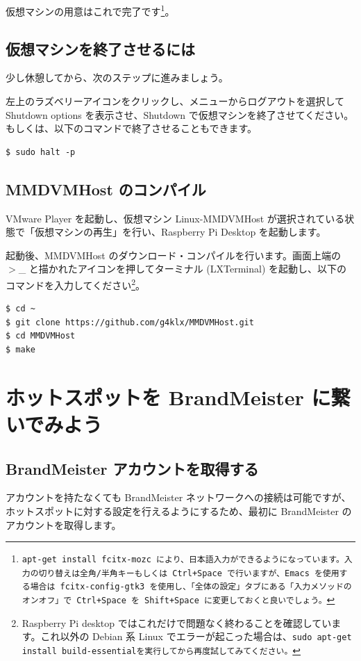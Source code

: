 \documentclass[a4j,oneside]{ujbook}
\begin{document}
仮想マシンの用意はこれで完了です\footnote{\tt{apt-get install fcitx-mozc} により、日本語入力ができるようになっています。入力の切り替えは全角/半角キーもしくは Ctrl+Space で行いますが、Emacs を使用する場合は \tt{fcitx-config-gtk3} を使用し、「全体の設定」タブにある「入力メソッドのオンオフ」で Ctrl+Space を Shift+Space に変更しておくと良いでしょう。}。

\section{仮想マシンを終了させるには}
少し休憩してから、次のステップに進みましょう。

左上のラズベリーアイコンをクリックし、メニューからログアウトを選択して Shutdown options を表示させ、Shutdown で仮想マシンを終了させてください。もしくは、以下のコマンドで終了させることもできます。

\begin{verbatim}
$ sudo halt -p
\end{verbatim}

\section{MMDVMHost のコンパイル}

VMware Player を起動し、仮想マシン Linux-MMDVMHost が選択されている状態で「仮想マシンの再生」を行い、Raspberry Pi Desktop を起動します。

起動後、MMDVMHost のダウンロード・コンパイルを行います。画面上端の $>$\_ と描かれたアイコンを押してターミナル (LXTerminal) を起動し、以下のコマンドを入力してください\footnote{Raspberry Pi desktop ではこれだけで問題なく終わることを確認しています。これ以外の Debian 系 Linux でエラーが起こった場合は、\tt{sudo apt-get install build-essential}を実行してから再度試してみてください。}。

\begin{verbatim}
$ cd ~
$ git clone https://github.com/g4klx/MMDVMHost.git
$ cd MMDVMHost
$ make
\end{verbatim}

\chapter{ホットスポットを BrandMeister に繋いでみよう}

\section{BrandMeister アカウントを取得する}
アカウントを持たなくても BrandMeister ネットワークへの接続は可能ですが、ホットスポットに対する設定を行えるようにするため、最初に BrandMeister のアカウントを取得します。
\end{document}
